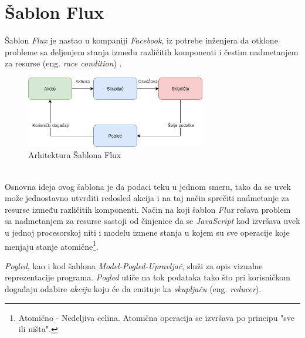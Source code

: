 \documentclass[12pt,oneside]{memoir}
\begin{document}
\section{Šablon Flux}
Šablon \emph{Flux} je nastao u kompaniji \emph{Facebook}, iz potrebe inženjera da otklone probleme sa 
deljenjem stanja između različitih komponenti i čestim nadmetanjem za resurse (eng. \emph{race condition}) \cite{raceCondition}.
\begin{figure}[!ht]
  \centering
  \includegraphics[width=0.7\textwidth]{slike/FLUX_pattern.png}
  \caption{Arhitektura Šablona Flux}
  \label{fig:flux}
\end{figure}
\\
Osnovna ideja ovog šablona je da podaci teku u jednom smeru, tako da se uvek može jednostavno
utvrditi redosled akcija i na taj način sprečiti nadmetanje za resurse između različitih komponenti.
Način na koji šablon \emph{Flux} rešava problem sa nadmetanjem za resurse sastoji od činjenice da se \emph{JavaScript}
kod izvršava uvek u jednoj procesorskoj niti i modelu izmene stanja u kojem su sve operacije koje menjaju stanje atomične\footnote{Atomično - Nedeljiva celina. Atomična operacija se izvršava po principu "sve ili ništa".}.

\emph{Pogled}, kao i kod šablona \emph{Model-Pogled-Upravljač}, služi za opis vizualne reprezentacije programa.
\emph{Pogled} utiče na tok podataka tako što pri korisničkom događaju odabire \emph{akciju} koju će da emituje
ka \emph{skupljaču} (eng. \emph{reducer}).
\end{document}
